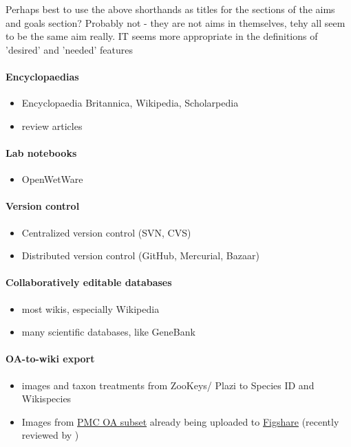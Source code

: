 \documentclass[final,authoryear,3p]{elsarticle-open-drafting}
\begin{document}
Perhaps best to use the above shorthands as titles for the sections of the aims and goals section?
Probably not - they are not aims in themselves, tehy all seem to be the same aim really. IT seems more appropriate in the definitions of 'desired' and 'needed' features


	
\paragraph{Encyclopaedias}
\begin{itemize}
	\item Encyclopaedia Britannica, Wikipedia, Scholarpedia
	\item review articles
\end{itemize}

\paragraph{Lab notebooks}
\begin{itemize}
	\item OpenWetWare
\end{itemize}

\paragraph{Version control}
\begin{itemize}
	\item Centralized version control (SVN, CVS)
	\item Distributed version control (GitHub, Mercurial, Bazaar)
\end{itemize}

\paragraph{Collaboratively editable databases}
\begin{itemize}
	\item most wikis, especially Wikipedia
	\item many scientific databases, like GeneBank
\end{itemize}

\paragraph{OA-to-wiki export}
\begin{itemize}
	\item images and taxon treatments from ZooKeys/ Plazi to Species ID and Wikispecies
	\item Images from \href{http://www.ncbi.nlm.nih.gov/pmc/tools/openftlist/}{PMC OA subset} already being uploaded to \href{http://figshare.com/}{Figshare} (recently reviewed by \href{http://dx.doi.org/10.4103/0976-500X.81919}{\citep{singh2011f}})
\end{itemize}
\end{document}
